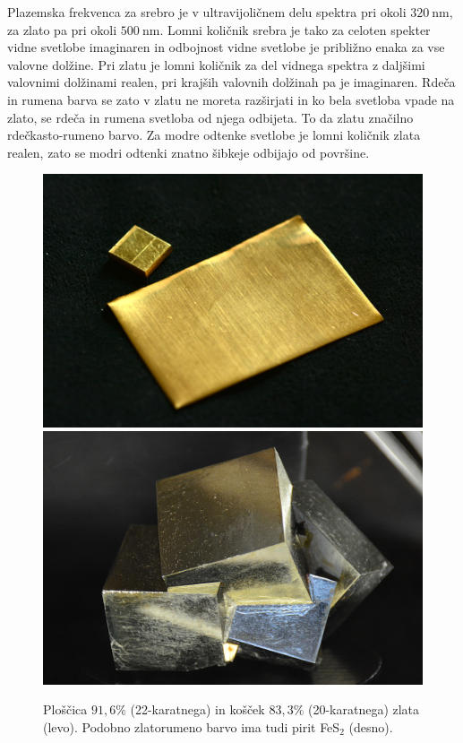 Plazemska frekvenca za srebro je v ultravijoličnem delu spektra 
pri okoli $320~\si{\nano\meter}$, za zlato pa pri okoli $500~\si{\nano\meter}$.
Lomni količnik srebra je tako za celoten spekter vidne svetlobe imaginaren in odbojnost
vidne svetlobe je približno enaka za vse valovne dolžine. Pri zlatu je lomni 
količnik za del vidnega spektra z daljšimi valovnimi dolžinami realen, pri 
krajših valovnih dolžinah pa je imaginaren. Rdeča in rumena barva se zato v zlatu 
ne moreta razširjati in ko bela svetloba vpade na zlato, se rdeča in rumena svetloba
od njega odbijeta. To da zlatu značilno rdečkasto-rumeno barvo. Za modre odtenke
svetlobe je lomni količnik zlata realen, zato se modri odtenki znatno šibkeje odbijajo od površine.
\begin{figure}[ht]
\centering
\includegraphics[width=7truecm]{slike/09_zlato.jpg}\hfill
\includegraphics[width=7truecm]{slike/09_pirit.jpg}
\caption{Ploščica $91,6\%$ (22-karatnega) in košček $83,3\%$ (20-karatnega) zlata (levo). 
Podobno zlatorumeno barvo ima tudi pirit FeS$_2$ (desno).}
\label{fig:09_zlato}
\end{figure}
